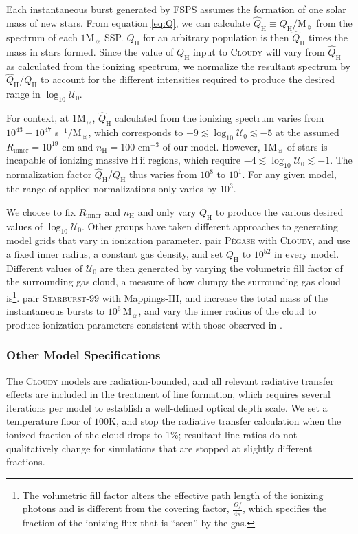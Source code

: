 \documentclass[trackchanges, twocolumn, tighten]{aastex61}
\newcommand{\Eq}[1]{\autoref{eq:#1}}
\newcommand{\FSPS}{{\sc FSPS}\xspace}
\newcommand{\Mappings}{{\sc Mappings-III}\xspace}
\newcommand{\Pegase}{\textsc{P{\'e}gase}\xspace}
\newcommand{\SB}{\textsc{Starburst-99}\xspace}
\newcommand{\Cloudy}{\textsc{Cloudy}\xspace}
\newcommand{\logten}{\ensuremath{\log_{10}}}
\newcommand\Msun{\ensuremath{\mathrm{M_{\sun}}}}
\newcommand{\hii}{H\,{\sc ii}\xspace}
\newcommand{\nH}{\ensuremath{n_{\mathrm{H}}}}
\newcommand{\cm}[1]{\ensuremath{\mathrm{cm}^{#1}}}
\newcommand{\Rin}{\ensuremath{R_{\mathrm{inner}}}}
\newcommand{\QH}{\ensuremath{Q_{\mathrm{H}}}}
\newcommand{\QHat}{\ensuremath{\hat{Q}_{\mathrm{H}}}}
\newcommand{\U}{\ensuremath{\mathcal{U}_{0}}}
\newcommand{\logU}{\ensuremath{\logten \mathcal{U}_0}}
\begin{document}
Each instantaneous burst generated by \FSPS assumes the formation of one solar mass of new stars. From equation \Eq{Q}, we can calculate $\QHat \equiv \QH/\Msun$ from the spectrum of each $1\Msun$ SSP. \QH{} for an arbitrary population is then \QHat{} times the mass in stars formed. Since the value of \QH{} input to \Cloudy will vary from \QHat{} as calculated from the ionizing spectrum, we normalize the resultant spectrum by \QHat{}/\QH{} to account for the different intensities required to produce the desired range in \logU{}.

For context, at $1 \Msun{}$, \QHat{} calculated from the ionizing spectrum varies from $10^{43} - 10^{47}$ s$^{-1}/\Msun{}$, which corresponds to $-9 \lesssim \logU \lesssim -5$ at the assumed $\Rin{} = 10^{19}$ cm and $\nH=100$ \cm{-3} of our model. However, $1\Msun$ of stars is incapable of ionizing massive \hii regions, which require $-4 \lesssim \logU \lesssim -1$. The normalization factor \QHat{}/\QH{} thus varies from $10^8$ to $10^1$. For any given model, the range of applied normalizations only varies by $10^3$.

We choose to fix \Rin{} and \nH{} and only vary \QH{} to produce the various desired values of \logU{}. Other groups have taken different approaches to generating model grids that vary in ionization parameter. \citet{Moy01} pair \Pegase with \Cloudy, and use a fixed inner radius, a constant gas density, and set \QH{} to $10^{52}$ in every model. Different values of \U{} are then generated by varying the volumetric fill factor of the surrounding gas cloud, a measure of how clumpy the surrounding gas cloud is\footnote{The volumetric fill factor alters the effective path length of the ionizing photons and is different from the covering factor, $\frac{\Omega/}{4\pi}$, which specifies the fraction of the ionizing flux that is ``seen'' by the gas.}. \citet{Levesque10} pair \SB with \Mappings, and increase the total mass of the instantaneous bursts to $10^6\,\Msun$, and vary the inner radius of the cloud to produce ionization parameters consistent with those observed in \citet{Rigby04}.

\subsubsection{Other Model Specifications}\label{sec:methods:cloudy:other}

The \Cloudy models are radiation-bounded, and all relevant radiative transfer effects are included in the treatment of line formation, which requires several iterations per model to establish a well-defined optical depth scale. We set a temperature floor of $100$K, and stop the radiative transfer calculation when the ionized fraction of the cloud drops to 1\%; resultant line ratios do not qualitatively change for simulations that are stopped at slightly different fractions.
\end{document}
